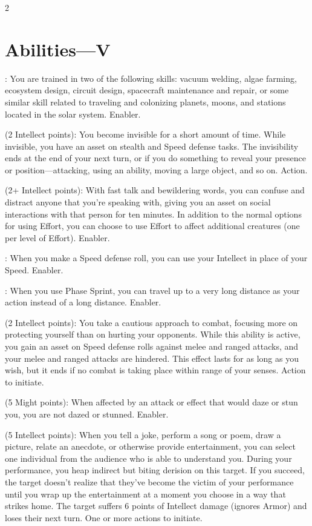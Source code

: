 \begin{multicols}{2}

\section{Abilities—V}

: You are trained in two of the following skills: vacuum welding, algae farming, ecosystem design, circuit design, spacecraft maintenance and repair, or some similar skill related to traveling and colonizing planets, moons, and stations located in the solar system. Enabler. 
 
 (2 Intellect points): You become invisible for a short amount of time. While invisible, you have an asset on stealth and Speed defense tasks. The invisibility ends at the end of your next turn, or if you do something to reveal your presence or position—attacking, using an ability, moving a large object, and so on. Action. 
 
 (2+ Intellect points): With fast talk and bewildering words, you can confuse and distract anyone that you’re speaking with, giving you an asset on social interactions with that person for ten minutes. In addition to the normal options for using Effort, you can choose to use Effort to affect additional creatures (one per level of Effort). Enabler. 
 
: When you make a Speed defense roll, you can use your Intellect in place of your Speed. Enabler. 
 
: When you use Phase Sprint, you can travel up to a very long distance as your action instead of a long distance. Enabler. 
 
 (2 Intellect points): You take a cautious approach to combat, focusing more on protecting yourself than on hurting your opponents. While this ability is active, you gain an asset on Speed defense rolls against melee and ranged attacks, and your melee and ranged attacks are hindered. This effect lasts for as long as you wish, but it ends if no combat is taking place within range of your senses. Action to initiate. 
 
 (5 Might points): When affected by an attack or effect that would daze or stun you, you are not dazed or stunned. Enabler. 
 
 (5 Intellect points): When you tell a joke, perform a song or poem, draw a picture, relate an anecdote, or otherwise provide entertainment, you can select one individual from the audience who is able to understand you. During your performance, you heap indirect but biting derision on this target. If you succeed, the target doesn’t realize that they’ve become the victim of your performance until you wrap up the entertainment at a moment you choose in a way that strikes home. The target suffers 6 points of Intellect damage (ignores Armor) and loses their next turn. One or more actions to initiate. 
 

\end{multicols}
